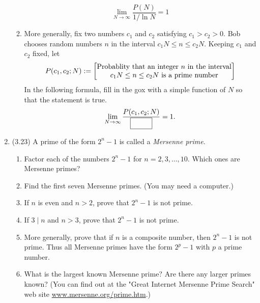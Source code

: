\documentclass[12pt]{amsart}
\theoremstyle{definition}
\begin{document}
\begin{enumerate}
\begin{enumerate}
\begin{displaymath}
				\lim_{N \to \infty} \frac{P(N)}{1/\ln N} = 1
			\end{displaymath}
			\item More generally, fix two numbers $c_1$ and $c_2$ satisfying $c_1 > 
				c_2 > 0$. Bob chooses random numbers $n$ in the interval 
				$c_1 N \leq n \leq c_2 N$. Keeping $c_1$ and $c_2$ fixed, let 
			\begin{displaymath}
				P(c_1,c_2;N) := \left[\Centerstack{\text{Probablity that an integer 
					$n$ in the interval} \newline \text{$c_1N \leq n \leq 
					c_2 N$ is a prime number}}\right]
			\end{displaymath}
			In the following formula, fill in the gox with a simple function of $N$ 
			so that the statement is true. 
			\begin{displaymath}
				\lim_{N \to \infty} \frac{P(c_1,c_2;N)}{\framebox(3em,1.5em){}} = 1. 
			\end{displaymath}
		\end{enumerate}
	\item (3.23) A prime of the form $2^n-1$ is called a \textit{Mersenne prime}. 
		\begin{enumerate}
			\item Factor each of the numbers $2^n-1$ for $n=2,3,\ldots,10$. Which ones 
				are Mersenne primes?
			\item Find the first seven Mersenne primes. (You may need a computer.)
			\item If $n$ is even and $n > 2$, prove that $2^n-1$ is not prime.
			\item If $3 \mid n$ and $n > 3$, prove that $2^n-1$ is not prime.
			\item More generally, prove that if $n$ is a composite number, then 
				$2^n-1$ is not prime. Thus all Mersenne primes have the form 
				$2^p-1$ with $p$ a prime number. 
			\item What is the largest known Mersenne prime? Are there any larger 
				primes known? (You can find out at the "Great Internet Mersenne 
				Prime Search" web site \url{www.mersenne.org/prime.htm}.)
		\end{enumerate}
			
			
\end{enumerate}
\end{document}
